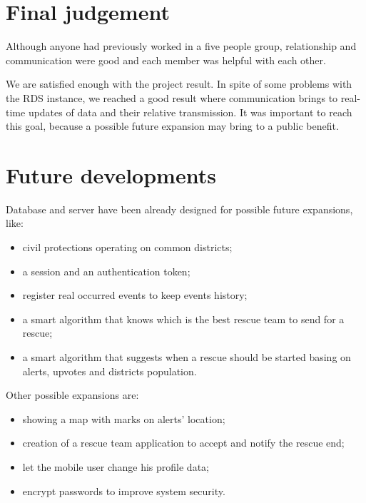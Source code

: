 \documentclass[a4paper,12pt]{report}
\begin{document}
\section{Final judgement}

Although anyone had previously worked in a five people group, relationship and communication were good and each member was helpful with each other.

We are satisfied enough with the project result. In spite of some problems with the RDS instance, we reached a good result where communication brings to real-time updates of data and their relative transmission. It was important to reach this goal, because a possible future expansion may bring to a public benefit.

\section{Future developments}

Database and server have been already designed for possible future expansions, like:
\begin{itemize}
\item civil protections operating on common districts;
\item a session and an authentication token;
\item register real occurred events to keep events history;
\item a smart algorithm that knows which is the best rescue team to send for a rescue;
\item a smart algorithm that suggests when a rescue should be started basing on alerts, upvotes and districts population.
\end{itemize}

Other possible expansions are:

\begin{itemize}
\item showing a map with marks on alerts' location;
\item creation of a rescue team application to accept and notify the rescue end;
\item let the mobile user change his profile data;
\item encrypt passwords to improve system security.
\end{itemize}
\end{document}

